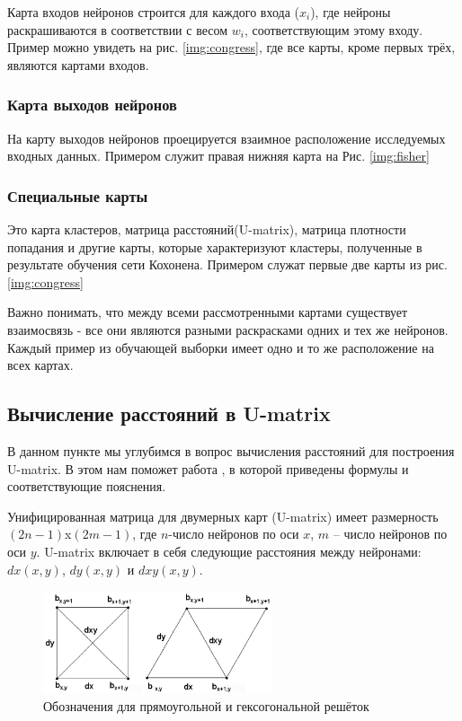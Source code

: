 \documentclass[a4paper,12pt]{article}
\begin{document}
Карта входов нейронов строится для каждого входа ($x_i$), где нейроны раскрашиваются в соответствии с весом $w_i$, соответствующим этому входу. Пример можно увидеть на рис. \ref{img:congress}, где все карты, кроме первых трёх, являются картами входов.

\subsubsection{Карта выходов нейронов}

На карту выходов нейронов проецируется взаимное расположение исследуемых входных данных. Примером служит правая нижняя карта на Рис. \ref{img:fisher}

\subsubsection{Специальные карты}

Это карта кластеров, матрица расстояний(U-matrix), матрица плотности попадания и другие карты, которые характеризуют кластеры, полученные в результате обучения сети Кохонена. Примером служат первые две карты из рис. \ref{img:congress}

Важно понимать, что между всеми рассмотренными картами существует взаимосвязь - все они являются разными раскрасками одних и тех же нейронов. Каждый пример из обучающей выборки имеет одно и то же расположение на всех картах.\cite{intuit}

\subsection{Вычисление расстояний в U-matrix}

В данном пункте мы углубимся в вопрос вычисления расстояний для построения U-matrix. В этом нам поможет работа \cite{distance}, в которой приведены формулы и соответствующие пояснения.

Унифицированная матрица для двумерных карт (U-matrix) имеет размерность $(2n-1)$x$(2m-1)$, где $n$-число нейронов по оси $x$, $m$ – число нейронов по оси $y$. U-matrix включает в себя следующие расстояния между нейронами: $dx(x,y)$, $dy(x,y)$ и $dxy(x,y)$.

\begin{figure}[H]
  \centering
  \includegraphics[width=0.6\textwidth]{u-matrix-distance.png}
  \caption{Обозначения для прямоугольной и гексогональной решёток}
  \label{img:u-matrix-distance}
\end{figure}
\end{document}
